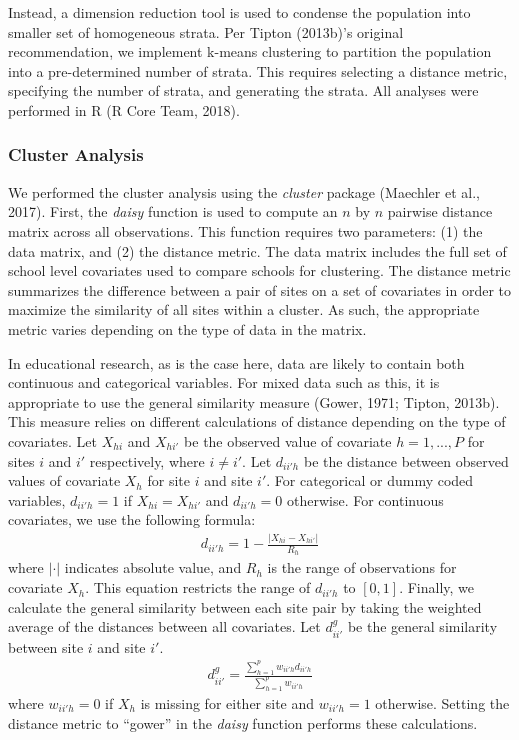 \documentclass[man,floatsintext]{apa6}
\begin{document}
Instead, a dimension reduction tool is used to condense the population into smaller set of homogeneous strata. Per Tipton (2013b)'s original recommendation, we implement k-means clustering to partition the population into a pre-determined number of strata. This requires selecting a distance metric, specifying the number of strata, and generating the strata. All analyses were performed in R (R Core Team, 2018).

\hypertarget{cluster-analysis}{%
\subsubsection{Cluster Analysis}\label{cluster-analysis}}

We performed the cluster analysis using the \emph{cluster} package (Maechler et al., 2017). First, the \emph{daisy} function is used to compute an \(n\) by \(n\) pairwise distance matrix across all observations. This function requires two parameters: (1) the data matrix, and (2) the distance metric. The data matrix includes the full set of school level covariates used to compare schools for clustering. The distance metric summarizes the difference between a pair of sites on a set of covariates in order to maximize the similarity of all sites within a cluster. As such, the appropriate metric varies depending on the type of data in the matrix.

In educational research, as is the case here, data are likely to contain both continuous and categorical variables. For mixed data such as this, it is appropriate to use the general similarity measure (Gower, 1971; Tipton, 2013b). This measure relies on different calculations of distance depending on the type of covariates. Let \(X_{hi}\) and \(X_{hi'}\) be the observed value of covariate \(h = {1, ..., P}\) for sites \(i\) and \(i'\) respectively, where \(i \ne i'\). Let \(d_{ii'h}\) be the distance between observed values of covariate \(X_{h}\) for site \(i\) and site \(i'\). For categorical or dummy coded variables, \(d_{ii'h} = 1\) if \(X_{hi} = X_{hi'}\) and \(d_{ii'h} = 0\) otherwise. For continuous covariates, we use the following formula:
\begin{align}
d_{ii'h} = 1 - \frac{|X_{hi} - X_{hi'}|}{R_h}
\end{align}
where \(|\cdot|\) indicates absolute value, and \(R_h\) is the range of observations for covariate \(X_h\). This equation restricts the range of \(d_{ii'h}\) to \([0,1]\). Finally, we calculate the general similarity between each site pair by taking the weighted average of the distances between all covariates. Let \(d^{g}_{ii'}\) be the general similarity between site \(i\) and site \(i'\).
\begin{align}
d^{g}_{ii'} = \frac{\sum^p_{h = 1}w_{ii'h}d_{ii'h}}{\sum^p_{h = 1}w_{ii'h}}
\end{align}
where \(w_{ii'h} = 0\) if \(X_h\) is missing for either site and \(w_{ii'h} = 1\) otherwise. Setting the distance metric to \enquote{gower} in the \emph{daisy} function performs these calculations.
\end{document}
